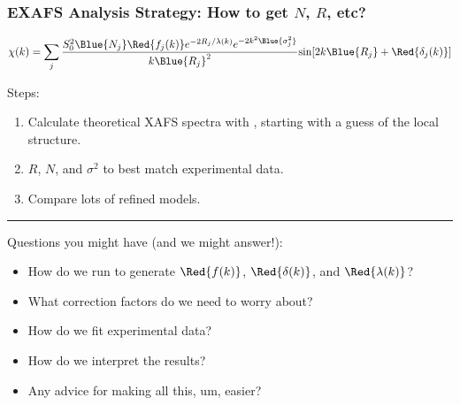 \begin{frame}  \frametitle{EXAFS Analysis Strategy:  How to get $N$, $R$, etc?}

  \begin{cenpage}{125mm}

      \[
      \chi(k) = \sum_j {{ S_0^2 {\Blue{N_j}} {\Red{f_j(k)}}  e^{-2R_j/\lambda(k)}
          e^{-2k^2{\Blue{\sigma_j^2}}}}\over{k{\Blue{R_j}}^2}}
      {\sin[{2k{\Blue{R_j}} + {\Red{\delta_j(k)}}} ]}
      \]

   \vmm
   Steps:
   \begin{enumerate}
   \item Calculate theoretical XAFS spectra  with {\feff},  starting with a guess of the local structure.
   \item  {} $R$, $N$, and $\sigma^2$  to best match  experimental data.
   \item Compare lots of refined models.
   \end{enumerate}

\vmm \vmm \hrule \vmm\vmm

 Questions you might have (and we might answer!):

  \begin{itemize}
  \item How do we run {\feff} to generate $\Red{f(k)}$, $\Red{\delta(k)}$,
    and  $\Red{\lambda(k)}$?
  \item What correction factors do we need to worry about?
  \item How do we fit experimental data?
  \item How do we interpret the results?
  \item Any advice for making all this, um, easier?
  \end{itemize}

\vfill
   \end{cenpage}

\end{frame}
